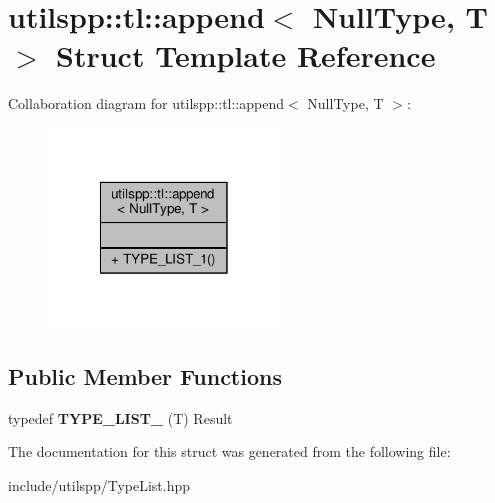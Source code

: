 \hypertarget{structutilspp_1_1tl_1_1append_3_01NullType_00_01T_01_4}{\section{utilspp\-:\-:tl\-:\-:append$<$ Null\-Type, T $>$ Struct Template Reference}
\label{structutilspp_1_1tl_1_1append_3_01NullType_00_01T_01_4}
}


Collaboration diagram for utilspp\-:\-:tl\-:\-:append$<$ Null\-Type, T $>$\-:\nopagebreak
\begin{figure}[H]
\begin{center}
\leavevmode
\includegraphics[width=174pt]{structutilspp_1_1tl_1_1append_3_01NullType_00_01T_01_4__coll__graph}
\end{center}
\end{figure}
\subsection*{Public Member Functions}
\begin{DoxyCompactItemize}
\item 
\hypertarget{structutilspp_1_1tl_1_1append_3_01NullType_00_01T_01_4_ac1e8e195f13a135885e3fdbcaf2dad96}{typedef {\bfseries T\-Y\-P\-E\-\_\-\-L\-I\-S\-T\-\_} (T) Result}\label{structutilspp_1_1tl_1_1append_3_01NullType_00_01T_01_4_ac1e8e195f13a135885e3fdbcaf2dad96}

\end{DoxyCompactItemize}


The documentation for this struct was generated from the following file\-:\begin{DoxyCompactItemize}
\item 
include/utilspp/Type\-List.\-hpp\end{DoxyCompactItemize}
